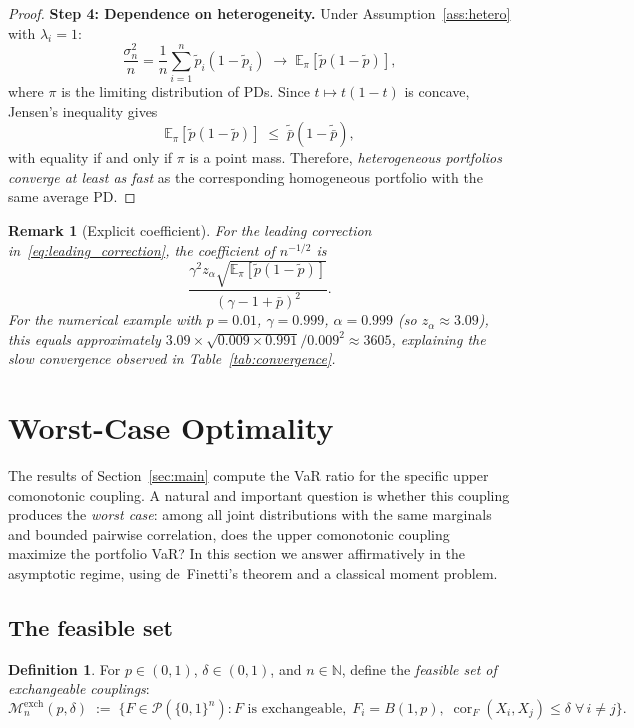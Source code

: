\documentclass[11pt]{article}
\newtheorem{remark}[theorem]{Remark}
\theoremstyle{definition}
\newtheorem{definition}[theorem]{Definition}
\newcommand{\N}{\mathbb{N}}
\newcommand{\E}{\mathbb{E}}
\newcommand{\1}{\mathbf{1}}
\newcommand{\calM}{\mathcal{M}}
\newcommand{\calP}{\mathcal{P}}
\begin{document}
\begin{proof}
\textbf{Step 4: Dependence on heterogeneity.} Under Assumption~\ref{ass:hetero} with $\lambda_i = 1$:
\[
  \frac{\sigma_n^2}{n} = \frac{1}{n}\sum_{i=1}^n \tilde{p}_i(1-\tilde{p}_i)
  \;\to\; \E_\pi[\tilde{p}(1-\tilde{p})],
\]
where $\pi$ is the limiting distribution of PDs. Since $t \mapsto t(1-t)$ is concave, Jensen's inequality gives
\[
  \E_\pi[\tilde{p}(1-\tilde{p})] \;\leq\; \tilde{\bar{p}}(1-\tilde{\bar{p}}),
\]
with equality if and only if $\pi$ is a point mass. Therefore, \emph{heterogeneous portfolios converge at least as fast} as the corresponding homogeneous portfolio with the same average PD.
\end{proof}

\begin{remark}[Explicit coefficient]\label{rem:be_constant}
For the leading correction in~\eqref{eq:leading_correction}, the coefficient of $n^{-1/2}$ is
\[
  \frac{\gamma^2 z_\alpha \sqrt{\E_\pi[\tilde{p}(1-\tilde{p})]}}{(\gamma - 1 + \bar{p})^2}.
\]
For the numerical example with $p = 0.01$, $\gamma = 0.999$, $\alpha = 0.999$ (so $z_\alpha \approx 3.09$), this equals approximately $3.09 \times \sqrt{0.009 \times 0.991}/0.009^2 \approx 3605$, explaining the slow convergence observed in Table~\ref{tab:convergence}.
\end{remark}

\section{Worst-Case Optimality}\label{sec:optimality}

The results of Section~\ref{sec:main} compute the VaR ratio for the specific upper comonotonic coupling. A natural and important question is whether this coupling produces the \emph{worst case}: among all joint distributions with the same marginals and bounded pairwise correlation, does the upper comonotonic coupling maximize the portfolio VaR? In this section we answer affirmatively in the asymptotic regime, using de~Finetti's theorem and a classical moment problem.

\subsection{The feasible set}\label{sec:feasible}

\begin{definition}\label{def:feasible}
For $p \in (0,1)$, $\delta \in (0,1)$, and $n \in \N$, define the \emph{feasible set of exchangeable couplings}:
\begin{equation}\label{eq:feasible}
  \calM_n^{\mathrm{exch}}(p, \delta) \;:=\; \bigl\{ F \in \calP(\{0,1\}^n) : F \text{ is exchangeable},\; F_i = B(1,p),\; \operatorname{cor}_F(X_i, X_j) \leq \delta \;\forall\, i \neq j \bigr\}.
\end{equation}
\end{definition}
\end{document}
